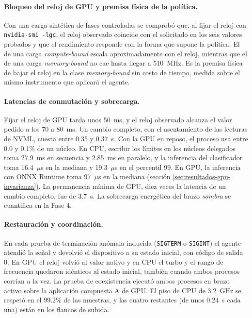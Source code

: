\paragraph{Bloqueo del reloj de GPU y premisa física de la política.}\label{sec:resultados-agente-candado} Con una carga sintética de fases controladas se comprobó que, al fijar el reloj con \texttt{nvidia-smi -lgc}, el reloj observado coincide con el solicitado en los seis valores probados y que el rendimiento responde con la forma que supone la política. El de una carga \textit{compute-bound} escala aproximadamente con el reloj, mientras que el de una carga \textit{memory-bound} no cae hasta llegar a 510~MHz. Es la premisa física de bajar el reloj en la clase \textit{memory-bound} sin costo de tiempo, medida sobre el mismo instrumento que aplicará el agente.

\label{sec:resultados-agente-operacion}\paragraph{Latencias de conmutación y sobrecarga.}\label{sec:resultados-agente-latencias} Fijar el reloj de GPU tarda unos 50~ms, y el reloj observado alcanza el valor pedido a los 70 a 80~ms. Un cambio completo, con el asentamiento de las lecturas de NVML, cuesta entre 0.35 y 0.37~s. Con la GPU en reposo, el proceso usa entre 0.0 y 0.1\% de un núcleo. En CPU, escribir los límites en los núcleos delegados toma 27.9~ms en secuencia y 2.85~ms en paralelo, y la inferencia del clasificador toma 16.4~$\mu$s en la mediana y 19.3~$\mu$s en el percentil 99. En GPU, la inferencia con ONNX Runtime toma 97~$\mu$s en la mediana (sección \ref{sec:resultados-gpu-invarianza}). La permanencia mínima de GPU, diez veces la latencia de un cambio completo, fue de 3.7~s. La sobrecarga energética del brazo \textit{sombra} se cuantifica en la Fase 4.

\paragraph{Restauración y coordinación.}\label{sec:resultados-agente-restauracion} En cada prueba de terminación anómala inducida (\texttt{SIGTERM} o \texttt{SIGINT}) el agente atendió la señal y devolvió el dispositivo a su estado inicial, con código de salida 0. En GPU el reloj volvió al valor nativo y en CPU el turbo y el rango de frecuencia quedaron idénticos al estado inicial, también cuando ambos procesos corrían a la vez. La prueba de coexistencia ejecutó ambos procesos en brazo activo sobre la aplicación compuesta A de GPU. El piso de CPU de 3.2~GHz se respetó en el 99.2\% de las muestras, y las cuatro restantes (de unos 0.24~s cada una) están en los flancos de subida.

